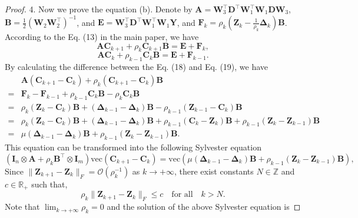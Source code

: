 \begin{proof}
4. Now we prove the equation (b). Denote by $\bm{A}=\bm{W}_{3}^{\top}\bm{D}^{\top}\bm{W}_{1}^{\top}\bm{W}_{1}\bm{D}\bm{W}_{3}$, $\bm{B}=\frac{1}{2}(\bm{W}_{2}\bm{W}_{2}^{\top})^{-1}$, and $\bm{E}=\bm{W}_{3}^{\top}\bm{D}^{\top}\bm{W}_{1}^{\top}\bm{W}_{1}\bm{Y}$, and $\bm{F}_{k}=\rho_{k}(\bm{Z}_{k} -\frac{1}{\rho_{k}}\bm{\Delta}_{k})\bm{B}$. According to the Eq. (13) in the main paper, we have
\begin{equation}
\label{e13}
\bm{A}\bm{C}_{k+1}
+
\rho_{k}\bm{C}_{k+1}\bm{B}
=
\bm{E}
+
\bm{F}_{k},
\end{equation}
\begin{equation}
\label{e13}
\bm{A}\bm{C}_{k}
+
\rho_{k-1}\bm{C}_{k}\bm{B}
=
\bm{E}
+
\bm{F}_{k-1}.
\end{equation}
By calculating the difference between the Eq. (18) and Eq. (19), we have
\begin{equation}
\begin{split}
\label{e13}
&
\bm{A}
(\bm{C}_{k+1} - \bm{C}_{k})
+
\rho_{k}
(\bm{C}_{k+1} - \bm{C}_{k})
\bm{B}
\\
=
&
\bm{F}_{k}
-
\bm{F}_{k-1}
+
\rho_{k-1}\bm{C}_{k}\bm{B}
-
\rho_{k}\bm{C}_{k}\bm{B}
\\
=
&
\rho_{k}(\bm{Z}_{k}-\bm{C}_{k})\bm{B}
+
(\bm{\Delta}_{k-1}-\bm{\Delta}_{k})\bm{B}
-
\rho_{k-1}(\bm{Z}_{k-1}-\bm{C}_{k})\bm{B}
\\
=
&
\rho_{k}(\bm{Z}_{k}-\bm{C}_{k})\bm{B}
+
(\bm{\Delta}_{k-1}-\bm{\Delta}_{k})\bm{B}
+
\rho_{k-1}(\bm{C}_{k}-\bm{Z}_{k})\bm{B}
+
\rho_{k-1}(\bm{Z}_{k}-\bm{Z}_{k-1})\bm{B}
\\
=
&
\mu(\bm{\Delta}_{k-1}-\bm{\Delta}_{k})\bm{B}
+
\rho_{k-1}(\bm{Z}_{k}-\bm{Z}_{k-1})\bm{B}.
\end{split}
\end{equation}
This equation can be transformed into the following Sylvester equation 
\begin{equation}
\label{e13}
(\bm{I}_{n}\otimes\mathbf{A}
+
\rho_{k}\bm{B}^{\top}\otimes\mathbf{I}_{m})\text{vec}(\bm{C}_{k+1} - \bm{C}_{k})
=
\text{vec}(\mu(\bm{\Delta}_{k-1}-\bm{\Delta}_{k})\bm{B}+\rho_{k-1}(\bm{Z}_{k}-\bm{Z}_{k-1})\bm{B}),
\end{equation}
Since $\|\bm{Z}_{k+1}-\bm{Z}_{k}\|_{F}=\mathcal{O}(\rho_{k}^{-1})$ as $k \to +\infty$, there exist constants $N\in\mathbb{Z}$ and $c\in\mathbb{R}_{+}$ such that,
\begin{equation}
\rho_{k}\|\bm{Z}_{k+1}-\bm{Z}_{k}\|_{F}
\le
c
\quad 
\text{for all}
\quad
k>N.
\end{equation}
Note that $\lim_{k \to +\infty}\rho_{k}=0$ and the solution of the above Sylvester equation is

\end{proof}
